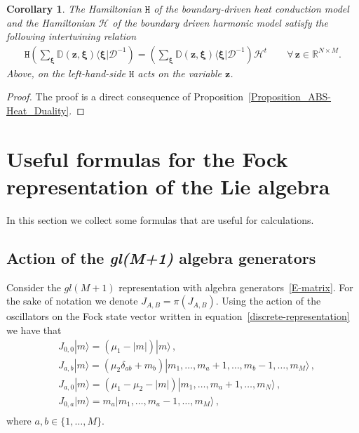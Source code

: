 \documentclass[11pt]{article}
\numberwithin{equation}{section}
\newtheorem{corollary}[theorem]{Corollary}
\newcommand{\M}{M}
\newcommand{\N}{N}
\newcommand{\eH}{\mathcal{H}}
\newcommand{\ecdH}{\mathtt{H}}
\newcommand{\eJ}{J}
\newcommand{\heat}{z}
\begin{document}
\begin{corollary}
 The Hamiltonian $\ecdH$ of the boundary-driven heat conduction model and the Hamiltonian $\eH$ of the boundary driven harmonic model satisfy the following intertwining relation
	\begin{equation}
	 	\begin{split}
	 		\ecdH \left(\sum_{\bm{\xi}} \mathbb{D}(\bm{\heat},\bm{\xi})\langle \bm{\xi}|\mathcal{D}^{-1}\right) =\left(\sum_{\bm{\xi}} \mathbb{D}(\bm{\heat},\bm{\xi})\langle \bm{\xi}|\mathcal{D}^{-1}\right) \eH^t\qquad  \forall \,\bm{\heat}\in \mathbb{R}^{\N\times \M}.
	 	\end{split}
	 \end{equation}
    Above, on the left-hand-side $\ecdH$ acts on the variable $\bm{\heat}$. 

\end{corollary}
\begin{proof}
    The proof is a direct consequence of Proposition~\ref{Proposition_ABS-Heat_Duality}. 
					     \end{proof}


 










\vspace{1cm}
\appendix
{}
\section{Useful formulas for the Fock representation of the Lie algebra}
In this section we collect some formulas that are useful for calculations. 
\subsection{Action of the \textit{gl(M+1)} algebra generators}
Consider the $gl(\M+1)$ representation with algebra generators~\eqref{E-matrix}. For the sake of notation we denote $\eJ_{A,B}=\pi(J_{A,B})$. Using the action of the oscillators on the Fock state vector written in equation~\eqref{discrete-representation} we have that 
\begin{equation}
\begin{split}
	&\eJ_{0,0}|m\rangle=(\mu_{1}-|m|)|m\rangle\,, \\
    &\eJ_{a,b}|m\rangle =(\mu_2\delta_{ab}+m_{b})|m_{1},\ldots,m_{a}+1,\ldots,m_{b}-1,\ldots,m_{\M}\rangle\,, \\
	&\eJ_{a,0}|m\rangle =(\mu_1-\mu_2-|m|)|m_{1},\ldots,m_{a}+1,\ldots, m_{N}\rangle \,,	\\
	&\eJ_{0,a}|m\rangle = m_{a}|m_{1},\ldots,m_{a}-1,\ldots,m_{\M}\rangle\,, \\
          \end{split}
\end{equation}
where $a,b\in \{1,\ldots,\M\}$.
\end{document}
